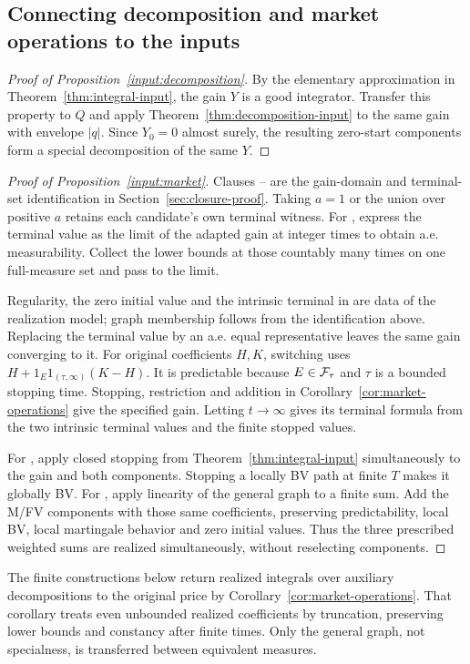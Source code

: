 \subsection{Connecting decomposition and market operations to the inputs}
\label{sec:auxiliary-transforms}
\begin{proof}[Proof of Proposition~\ref{input:decomposition}]
By the elementary approximation in Theorem~\ref{thm:integral-input}, the gain $Y$ is a good integrator.
Transfer this property to $Q$ and apply Theorem~\ref{thm:decomposition-input} to the same gain with envelope $|q|$.
Since $Y_0=0$ almost surely, the resulting zero-start components form a special decomposition of the same $Y$.
\end{proof}

\begin{proof}[Proof of Proposition~\ref{input:market}]
Clauses -- are the gain-domain and terminal-set identification in Section~\ref{sec:closure-proof}.
Taking $a=1$ or the union over positive $a$ retains each candidate's own terminal witness.
For , express the terminal value as the limit of the adapted gain at integer times to obtain a.e. measurability.
Collect the lower bounds at those countably many times on one full-measure set and pass to the limit.

Regularity, the zero initial value and the intrinsic terminal in  are data of the realization model;
graph membership follows from the identification above.
Replacing the terminal value by an a.e. equal representative leaves the same gain converging to it.
For original coefficients $H,K$, switching uses
$H+1_E1_{(\tau,\infty)}(K-H)$.
It is predictable because $E\in\mathcal F_\tau$ and $\tau$ is a bounded stopping time.
Stopping, restriction and addition in Corollary~\ref{cor:market-operations} give the specified gain.
Letting $t\to\infty$ gives its terminal formula from the two intrinsic terminal values and the finite stopped values.

For , apply closed stopping from Theorem~\ref{thm:integral-input} simultaneously to the gain and both components.
Stopping a locally BV path at finite $T$ makes it globally BV.
For , apply linearity of the general graph to a finite sum.
Add the M/FV components with those same coefficients, preserving predictability, local BV, local martingale behavior and zero initial values.
Thus the three prescribed weighted sums are realized simultaneously, without reselecting components.
\end{proof}

The finite constructions below return realized integrals over auxiliary decompositions to the original price by
Corollary~\ref{cor:market-operations}. That corollary treats even unbounded realized coefficients by truncation,
preserving lower bounds and constancy after finite times.
Only the general graph, not specialness, is transferred between equivalent measures.
